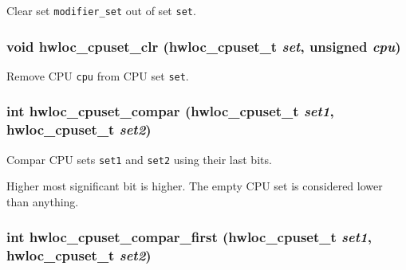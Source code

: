 Clear set {\tt modifier\_\-set} out of set {\tt set}. 

\hypertarget{group__hwlocality__cpuset_g9ae6610a008402bf7959234bd2044a82}{
\subsubsection[{hwloc\_\-cpuset\_\-clr}]{\setlength{\rightskip}{0pt plus 5cm}void hwloc\_\-cpuset\_\-clr ({\bf hwloc\_\-cpuset\_\-t} {\em set}, \/  unsigned {\em cpu})}}
\label{group__hwlocality__cpuset_g9ae6610a008402bf7959234bd2044a82}


Remove CPU {\tt cpu} from CPU set {\tt set}. 

\hypertarget{group__hwlocality__cpuset_ga72d138f3e7a4ea5de4cf7603ef436bf}{
\subsubsection[{hwloc\_\-cpuset\_\-compar}]{\setlength{\rightskip}{0pt plus 5cm}int hwloc\_\-cpuset\_\-compar ({\bf hwloc\_\-cpuset\_\-t} {\em set1}, \/  {\bf hwloc\_\-cpuset\_\-t} {\em set2})}}
\label{group__hwlocality__cpuset_ga72d138f3e7a4ea5de4cf7603ef436bf}


Compar CPU sets {\tt set1} and {\tt set2} using their last bits. 

Higher most significant bit is higher. The empty CPU set is considered lower than anything. \hypertarget{group__hwlocality__cpuset_g641ccf476257114e807bd74db0ca9cd0}{
\subsubsection[{hwloc\_\-cpuset\_\-compar\_\-first}]{\setlength{\rightskip}{0pt plus 5cm}int hwloc\_\-cpuset\_\-compar\_\-first ({\bf hwloc\_\-cpuset\_\-t} {\em set1}, \/  {\bf hwloc\_\-cpuset\_\-t} {\em set2})}}
\label{group__hwlocality__cpuset_g641ccf476257114e807bd74db0ca9cd0}



